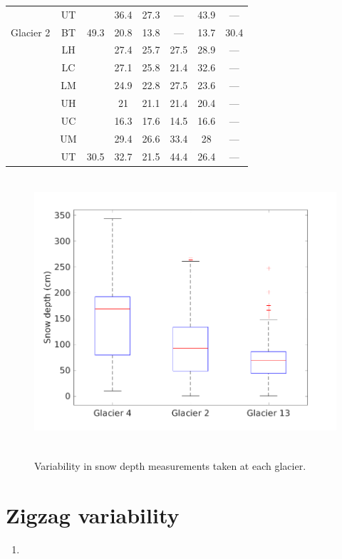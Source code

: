\documentclass[12pt]{article}
\begin{document}
\begin{table}[]
\begin{tabular}{cccccccc}
 & UT &  & 36.4 & 27.3 & --- & 43.9 & --- \\
\multirow{-8}{*}{Glacier 2} & BT & \multirow{-8}{*}{49.3} & 20.8 & 13.8 & --- & 13.7 & 30.4 \\
\rowcolor[HTML]{EFEFEF} 
\cellcolor[HTML]{EFEFEF} & LH & \cellcolor[HTML]{EFEFEF} & 27.4 & 25.7 & 27.5 & 28.9 & --- \\
\rowcolor[HTML]{EFEFEF} 
\cellcolor[HTML]{EFEFEF} & LC & \cellcolor[HTML]{EFEFEF} & 27.1 & 25.8 & 21.4 & 32.6 & --- \\
\rowcolor[HTML]{EFEFEF} 
\cellcolor[HTML]{EFEFEF} & LM & \cellcolor[HTML]{EFEFEF} & 24.9 & 22.8 & 27.5 & 23.6 & --- \\
\rowcolor[HTML]{EFEFEF} 
\cellcolor[HTML]{EFEFEF} & UH & \cellcolor[HTML]{EFEFEF} & 21 & 21.1 & 21.4 & 20.4 & --- \\
\rowcolor[HTML]{EFEFEF} 
\cellcolor[HTML]{EFEFEF} & UC & \cellcolor[HTML]{EFEFEF} & 16.3 & 17.6 & 14.5 & 16.6 & --- \\
\rowcolor[HTML]{EFEFEF} 
\cellcolor[HTML]{EFEFEF} & UM & \cellcolor[HTML]{EFEFEF} & 29.4 & 26.6 & 33.4 & 28 & --- \\
\rowcolor[HTML]{EFEFEF} 
\multirow{-7}{*}{\cellcolor[HTML]{EFEFEF}Glacier 13} & UT & \multirow{-7}{*}{\cellcolor[HTML]{EFEFEF}30.5} & 32.7 & 21.5 & 44.4 & 26.4 & ---
\end{tabular}
\end{table}

{
\begin{figure} 
\centering
	\includegraphics[height = 10cm]{box_depth.png}\\
	\caption{Variability in snow depth measurements taken at each glacier.}
	\label{fig:box_depth}
\end{figure}
}

\section{Zigzag variability}











\begin{enumerate}
\item 
\end{enumerate}
\end{document}
